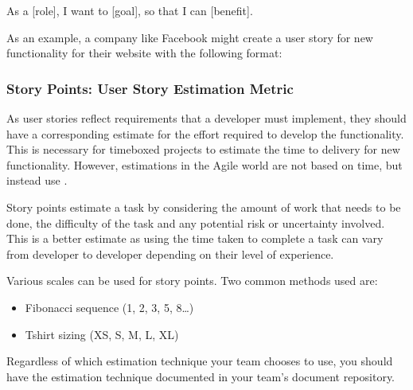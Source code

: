 \documentclass[letterpaper,10pt,english]{jupyterBook}
\begin{document}
\sphinxAtStartPar
As a {[}role{]}, I want to {[}goal{]}, so that I can {[}benefit{]}.

\sphinxAtStartPar
As an example, a company like Facebook might create a user story for new
functionality for their website with the following format:


\subsubsection{Story Points: User Story Estimation Metric}
\label{\detokenize{chapter_1/agile_methodology:story-points-user-story-estimation-metric}}
\sphinxAtStartPar
As user stories reflect requirements that a developer must implement,
they should have a corresponding estimate for the effort required to
develop the functionality. This is necessary for time\sphinxhyphen{}boxed projects to
estimate the time to delivery for new functionality. However,
estimations in the Agile world are not based on time, but instead use
.

\sphinxAtStartPar
Story points estimate a task by considering the amount of work that
needs to be done, the difficulty of the task and any potential risk or
uncertainty involved. This is a better estimate as using the time taken
to complete a task can vary from developer to developer depending on
their level of experience.

\sphinxAtStartPar
Various scales can be used for story points. Two common methods used
are:
\begin{itemize}
\item {} 
\sphinxAtStartPar
Fibonacci sequence (1, 2, 3, 5, 8…)

\item {} 
\sphinxAtStartPar
T\sphinxhyphen{}shirt sizing (XS, S, M, L, XL)

\end{itemize}

\sphinxAtStartPar
Regardless of which estimation technique your team chooses to use, you
should have the estimation technique documented in your team’s document
repository.
\end{document}
